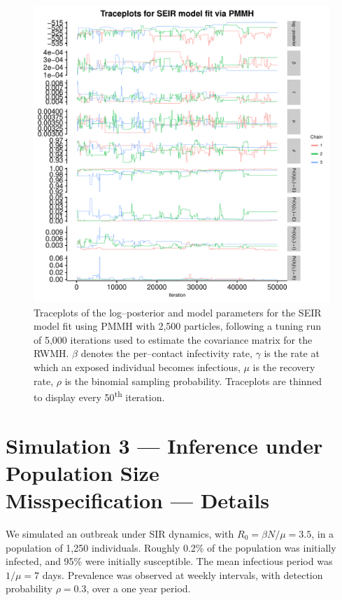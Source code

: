\begin{figure}[htbp]
	\centering
	\includegraphics[width=0.9\linewidth]{figures/misspec_seir_pmmh_traceplots.pdf}
	\caption{Traceplots of the log--posterior and model parameters for the SEIR model fit using PMMH with 2,500 particles, following a tuning run of 5,000 iterations used to estimate the covariance matrix for the RWMH. $ \beta $ denotes the per--contact infectivity rate,  $ \gamma $ is the rate at which an exposed individual becomes infectious, $ \mu $ is the recovery rate, $ \rho $ is the binomial sampling probability. Traceplots are thinned to display every 50\textsuperscript{th} iteration.}
	\label{fig:misspec_seir_pmmh_traceplots}
\end{figure}

\newpage

\section{Simulation 3 --- Inference under Population Size\\ Misspecification --- Details}
\label{sec:popsize_misspec_details}
We simulated an outbreak under SIR dynamics, with $ R_0 = \beta N / \mu =3.5 $, in a population of 1,250 individuals. Roughly 0.2\% of the population was initially infected, and 95\% were initially susceptible. The mean infectious period was $ 1/\mu = 7 $ days. Prevalence was observed at weekly intervals, with detection probability $ \rho = 0.3 $, over a one year period.

